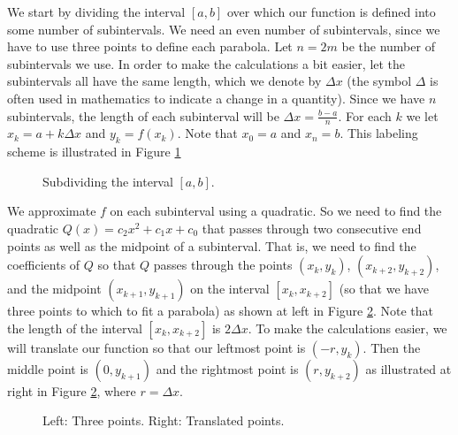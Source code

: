 We start by dividing the interval $[a,b]$ over which our function is defined into some number of subintervals. We need an even number of subintervals, since we have to use three points to define each parabola. Let $n = 2m$ be the number of subintervals we use. In order to make the calculations a bit easier, let the subintervals all have the same length, which we denote by $\Delta x$ (the symbol $\Delta$ is often used in mathematics to indicate a change in a quantity). Since we have $n$ subintervals, the length of each subinterval will be $\Delta x = \frac{b-a}{n}$.  For each $k$ we let $x_k = a+k \Delta x$ and $y_k = f(x_k)$. Note that $x_0 = a$ and $x_n=b$. This labeling scheme is illustrated in Figure \ref{F:1_b_partition}
\begin{figure}[h]
\begin{center}
\end{center}
\caption{Subdividing the interval $[a,b]$.}
\label{F:1_b_partition}
\end{figure}

We approximate $f$ on each subinterval using a quadratic. So we need to find the quadratic $Q(x) = c_2x^2+c_1x+c_0$ that passes through two consecutive end points as well as the midpoint of a subinterval. That is, we need to find the coefficients of $Q$ so that $Q$ passes through the points $(x_k,y_k)$, $(x_{k+2}, y_{k+2})$, and the midpoint $(x_{k+1},y_{k+1})$ on the interval $[x_k, x_{k+2}]$ (so that we have three points to which to fit a parabola) as shown at left in Figure \ref{F:1_b_quad_fit}. Note that the length of the interval $[x_k, x_{k+2}]$ is $2\Delta x$.  To make the calculations easier, we will translate our function so that our leftmost point is $(-r, y_k)$. Then the middle point is $(0, y_{k+1})$ and the rightmost point is $(r, y_{k+2})$ as illustrated at right in Figure \ref{F:1_b_quad_fit}, where $r = \Delta x$.   
\begin{figure}[h]
\begin{center}
 \hspace{0.5in} 
\end{center}
\caption{Left: Three points. Right: Translated points.}
\label{F:1_b_quad_fit}
\end{figure}


